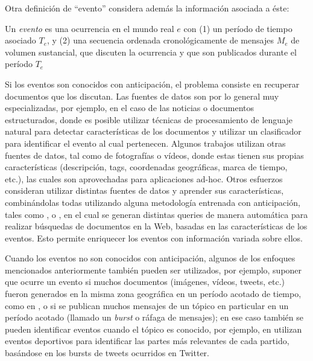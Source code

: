 \documentclass[upright, contnum]{umemoria}
\begin{document}
   Otra definición de ``evento'' considera además la información
   asociada a éste\cite{allan2002topic}:

   \begin{defn} Un \emph{evento} es una ocurrencia en el mundo real $e$ con
   (1) un período de tiempo asociado $T_e$, y (2) una secuencia
   ordenada cronológicamente de mensajes $M_e$ de volumen sustancial,
   que discuten la ocurrencia y que son publicados durante el período
   $T_e$ \end{defn}

   Si los eventos son conocidos con anticipación, el problema consiste
   en recuperar documentos que los discutan. Las fuentes de datos son
   por lo general muy especializadas, por ejemplo, en el caso de las
   noticias\cite{Diakopoulos:2012:FAS:2208276.2208409} o documentos
   estructurados, donde es posible utilizar técnicas de procesamiento
   de lenguaje natural para detectar características de los documentos
   y utilizar un clasificador para identificar el evento al cual
   pertenecen. Algunos trabajos utilizan otras fuentes de datos, tal
   como de fotografías o vídeos, donde estas tienen sus propias
   características (descripción, tags, coordenadas geográficas,
   marca de tiempo, etc.), las cuales son aprovechadas para
   aplicaciones ad-hoc\cite{Liu:2011:USM:2072609.2072613}. Otros
   esfuerzos consideran utilizar distintas fuentes de datos y aprender
   sus características, combinándolas todas utilizando alguna
   metodología entrenada con anticipación, tales como
   \cite{Becker:2010:LSM:1718487.1718524}, o
   \cite{Becker:2012:ICP:2124295.2124360}, en el cual se generan
   distintas queries de manera automática para realizar búsquedas de
   documentos en la Web, basadas en las características de los
   eventos. Esto permite  enriquecer los  eventos con información
   variada sobre ellos. 

   Cuando los eventos no son conocidos con anticipación, algunos de
   los enfoques mencionados anteriormente también pueden ser
   utilizados, por ejemplo, suponer que ocurre un evento si muchos
   documentos (imágenes, vídeos, tweets, etc.) fueron generados en la
   misma zona geográfica en un período acotado de tiempo, como en
   \cite{Liu:2011:USM:2072609.2072613}, o si se publican muchos
   mensajes de un tópico en particular en un período acotado (llamado
   un \emph{burst} o ráfaga de mensajes); en ese caso también se pueden
   identificar eventos cuando el tópico es conocido, por ejemplo, en
   \cite{chakrabarti2011event} utilizan eventos deportivos para
   identificar las partes más relevantes de cada partido, basándose en
   los bursts de tweets ocurridos en Twitter.
\end{document}

